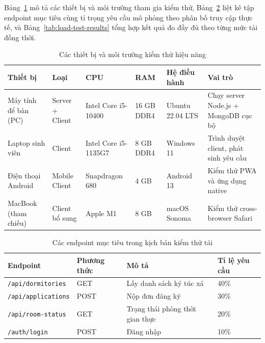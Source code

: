 \documentclass[../DoAn.tex]{subfiles}
\begin{document}
Bảng~\ref{tab:test-devices} mô tả các thiết bị và môi trường tham gia kiểm thử,
Bảng~\ref{tab:test-endpoints} liệt kê tập endpoint mục tiêu cùng tỉ trọng yêu cầu
mô phỏng theo phân bố truy cập thực tế, và Bảng~\ref{tab:load-test-results} tổng
hợp kết quả đo đầy đủ theo từng mức tải đồng thời.

\begin{table}[H]
\centering
\caption{Các thiết bị và môi trường kiểm thử hiệu năng}
\label{tab:test-devices}
\footnotesize
\begin{tabular}{|p{2.5cm}|p{1.8cm}|p{2.8cm}|p{1.3cm}|p{2.0cm}|p{3.0cm}|}
\hline
\textbf{Thiết bị} & \textbf{Loại} & \textbf{CPU} & \textbf{RAM} & \textbf{Hệ điều hành} & \textbf{Vai trò} \\
\hline
Máy tính để bàn (PC) & Server + Client & Intel Core i5-10400 & 16 GB DDR4 & Ubuntu 22.04 LTS & Chạy server Node.js + MongoDB cục bộ \\
\hline
Laptop sinh viên & Client & Intel Core i5-1135G7 & 8 GB DDR4 & Windows 11 & Trình duyệt client, phát sinh yêu cầu \\
\hline
Điện thoại Android & Mobile Client & Snapdragon 680 & 4 GB & Android 13 & Kiểm thử PWA và ứng dụng native \\
\hline
MacBook (tham chiếu) & Client bổ sung & Apple M1 & 8 GB & macOS Sonoma & Kiểm thử cross-browser Safari \\
\hline
\end{tabular}
\end{table}

\begin{table}[H]
\centering
\caption{Các endpoint mục tiêu trong kịch bản kiểm thử tải}
\label{tab:test-endpoints}
\footnotesize
\begin{tabular}{|p{4.0cm}|p{2.0cm}|p{5.0cm}|p{2.0cm}|}
\hline
\textbf{Endpoint} & \textbf{Phương thức} & \textbf{Mô tả} & \textbf{Tỉ lệ yêu cầu} \\
\hline
\texttt{/api/dormitories} & GET & Lấy danh sách ký túc xá & 40\% \\
\hline
\texttt{/api/applications} & POST & Nộp đơn đăng ký & 30\% \\
\hline
\texttt{/api/room-status} & GET & Trạng thái phòng thời gian thực & 20\% \\
\hline
\texttt{/auth/login} & POST & Đăng nhập & 10\% \\
\hline
\end{tabular}
\end{table}
\end{document}
